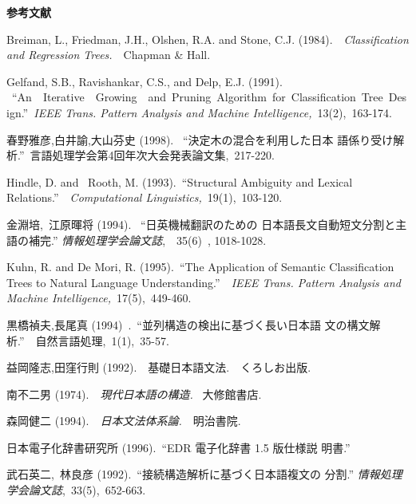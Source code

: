 \begin{list}{}{}
\item[{\large \bf \hspace*{1mm}参考文献\\}]
\item[Breiman, L., Friedman, J.H., Olshen, R.A. and Stone, C.J.](1984).\ \ 
{\it Classification  and Regression Trees.}\ \ {\rm Chapman \& Hall}.

\item[Gelfand, S.B., Ravishankar, C.S., and  Delp, E.J.](1991).
\ “An\ \ Iterative\ \ Growing\ \ and\ Pruning\ Algorithm\ for\
Classification\ Tree\ Design.”\ {\it IEEE Trans. Pattern Analysis
and Machine Intelligence,}\ 13(2),\ 163-174.

\item[春野雅彦,白井諭,大山芬史](1998). \ “決定木の混合を利用した日本
語係り受け解析.”\  言語処理学会第4回年次大会発表論文集,\ 217-220.

\item[Hindle, D. and \ Rooth, M.](1993).\ “Structural Ambiguity
and Lexical Relations.”\ \ {\it Computational Linguistics,}\ 19(1),\ 103-120.

\item[金淵培,\ 江原暉将](1994). \ “日英機械翻訳のための
日本語長文自動短文分割と主語の補完.” {\it 情報処理学会論文誌},\
\ 35(6)\ , 1018-1028.

\item[Kuhn, R. and De Mori, R.](1995).\ “The
Application of Semantic Classification Trees to Natural Language
Understanding.”\ \ {\it IEEE Trans.  Pattern Analysis and Machine
Intelligence,}\ 17(5),\ 449-460.

\item[黒橋禎夫,長尾真](1994)\ .\ “並列構造の検出に基づく長い日本語
文の構文解析.”\ \ 自然言語処理,\ 1(1),\ 35-57.

\item[益岡隆志,田窪行則](1992).\ \ 基礎日本語文法.\ \ くろしお出版.

\item[南不二男](1974).\ \ {\it 現代日本語の構造.} \ 大修館書店.

\item[森岡健二](1994).\ \  {\it 日本文法体系論.}\ \ 明治書院.

\item[日本電子化辞書研究所](1996).\ “EDR 電子化辞書 1.5 版仕様説
明書.”

\item[武石英二,\ 林良彦](1992).\ “接続構造解析に基づく日本語複文の
分割.” {\it 情報処理学会論文誌},\ 33(5),\ 652-663.


\end{list}
